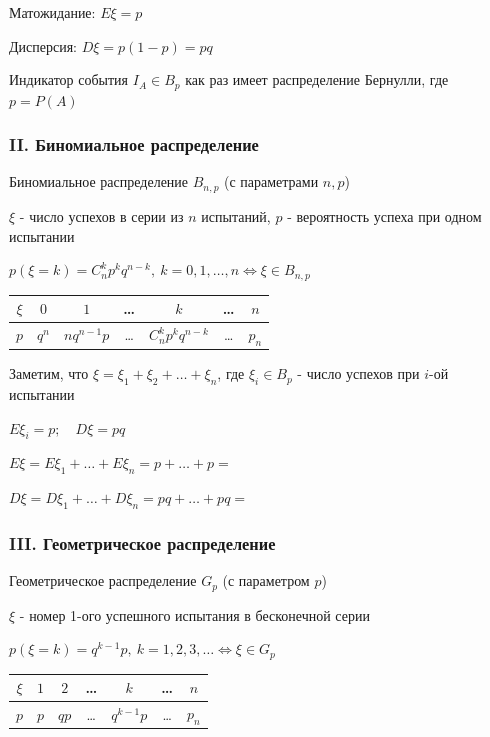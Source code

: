 \documentclass[12pt]{article}
\begin{document}
    Матожидание: $E\xi = p$

    Дисперсия: $D\xi = p(1 - p) = pq$

    \Ex Индикатор события $I_A \in B_p$ как раз имеет распределение Бернулли, где $p = P(A)$

    \subsubsection{II. Биномиальное распределение}

    Биномиальное распределение $B_{n,p}$ (с параметрами $n, p$)

    $\xi$ - число успехов в серии из $n$ испытаний, $p$ - вероятность успеха при одном испытании

    $p(\xi = k) = C^k_n p^k q^{n - k}, \ k = 0, 1, \dots, n \Longleftrightarrow \xi \in B_{n,p}$

    \smallvspace

    \begin{tabular}{c|c|c|c|c|c|c}
        $\xi$ & $0$        & $1$ & \dots & $k$ & \dots & $n$    \\
        \hline
        $p$   & $q^n$ & $n q^{n - 1} p$ & \dots & $C^k_n p^k q^{n - k}$ & \dots & $p_n$
    \end{tabular}

    \smallvspace

    Заметим, что $\xi = \xi_1 + \xi_2 + \dots + \xi_n$, где $\xi_i \in B_p$ - число успехов при $i$-ой испытании

    $E\xi_i = p; \quad D\xi = pq$

    $E\xi = E\xi_1 + \dots + E\xi_n = p + \dots + p = $ 

    $D\xi = D\xi_1 + \dots + D\xi_n = pq + \dots + pq = $ 

    
    \subsubsection{III. Геометрическое распределение}

    Геометрическое распределение $G_p$ (с параметром $p$)

    $\xi$ - номер 1-ого успешного испытания в бесконечной серии

    $p(\xi = k) = q^{k - 1}p, \ k = 1, 2, 3, \dots \Longleftrightarrow \xi \in G_p$

    \smallvspace
    
    \begin{tabular}{c|c|c|c|c|c|c}
        $\xi$ & $1$ & $2$ & \dots & $k$ & \dots & $n$    \\
        \hline
        $p$   & $p$ & $qp$ & \dots & $q^{k - 1}p$ & \dots & $p_n$
    \end{tabular}
\end{document}
